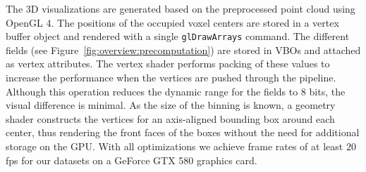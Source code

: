 \documentclass[review,journal]{vgtc}         %
\begin{document}
 The 3D visualizations are generated based on the preprocessed point cloud using OpenGL 4. The positions of the occupied voxel centers are stored in a vertex buffer object and rendered with a single \texttt{glDrawArrays} command. The different fields (see Figure~\ref{fig:overview:precomputation}) are stored in VBOs and attached as vertex attributes. The vertex shader performs packing of these values to increase the performance when the vertices are pushed through the pipeline. Although this operation reduces the dynamic range for the fields to 8 bits, the visual difference is minimal. As the size of the binning is known, a geometry shader constructs the vertices for an axis-aligned bounding box around each center, thus rendering the front faces of the boxes without the need for additional storage on the GPU. With all optimizations we achieve frame rates of at least $20$\,fps for our datasets on a GeForce GTX 580 graphics card.

\end{document}
